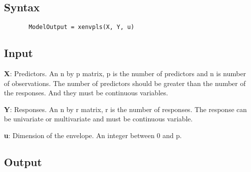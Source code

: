 \documentclass[a4paper,11pt,openany]{memoir}
\begin{document}
\subsection*{Syntax}


\begin{verbatim}       ModelOutput = xenvpls(X, Y, u)\end{verbatim}
    

\subsection*{Input}

\begin{par}
\textbf{X}: Predictors. An n by p matrix, p is the number of predictors and n is number of observations. The number of predictors should be greater than the number of the responses. And they must be continuous variables.
\end{par} \vspace{1em}
\begin{par}
\textbf{Y}: Responses. An n by r matrix, r is the number of responses. The response can be univariate or multivariate and must be continuous variable.
\end{par} \vspace{1em}
\begin{par}
\textbf{u}: Dimension of the envelope. An integer between 0 and p.
\end{par} \vspace{1em}


\subsection*{Output}
\end{document}
